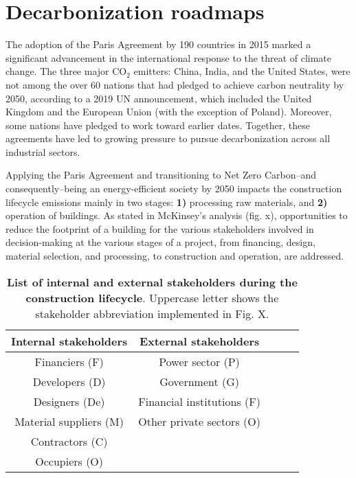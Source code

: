 \section{Decarbonization roadmaps}
\label{sec:decarbonization_roadmaps}

The adoption of the Paris Agreement by 190 countries in 2015 marked a significant advancement in the international response to the threat of climate change. The three major CO$_2$ emitters: China, India, and the United States, were not among the over 60 nations that had pledged to achieve carbon neutrality by 2050, according to a 2019 UN announcement, which included the United Kingdom and the European Union (with the exception of Poland).\autocite{summit2019report} Moreover, some nations have pledged to work toward earlier dates. Together, these agreements have led to growing pressure to pursue decarbonization across all industrial sectors.\autocite{hoffmann2021decarbonization}

Applying the Paris Agreement and transitioning to Net Zero Carbon–and consequently–being an energy-efficient society by 2050 impacts the construction lifecycle emissions mainly in two stages: \textbf{1)} processing raw materials, and \textbf{2)} operation of buildings. As stated in McKinsey's analysis\autocite{mckinsey_2020} (fig. x), opportunities to reduce the footprint of a building for the various stakeholders involved in decision-making at the various stages of a project, from financing, design, material selection, and processing, to construction and operation, are addressed. 

\begin{table}[!htb]
  \caption[List of internal and external stakeholders during the construction lifecycle]{\textbf{List of internal and external stakeholders during the construction lifecycle}. Uppercase letter shows the stakeholder abbreviation implemented in Fig. X.}
  \begin{scriptsize}
    \begin{tabulary}{0.65\linewidth}{ccccc}
      \textbf{Internal stakeholders} & \textbf{External stakeholders}  \\ \hline
      Financiers (F) &  Power sector (P) \\
      Developers (D) &  Government (G)   \\
      Designers (De) &  Financial institutions (F) \\
      Material suppliers (M) &  Other private sectors (O) \\
      Contractors (C) & \\
      Occupiers (O) & \\
    \end{tabulary}
  \end{scriptsize}
  \label{tab:stakeholders}
\end{table}


